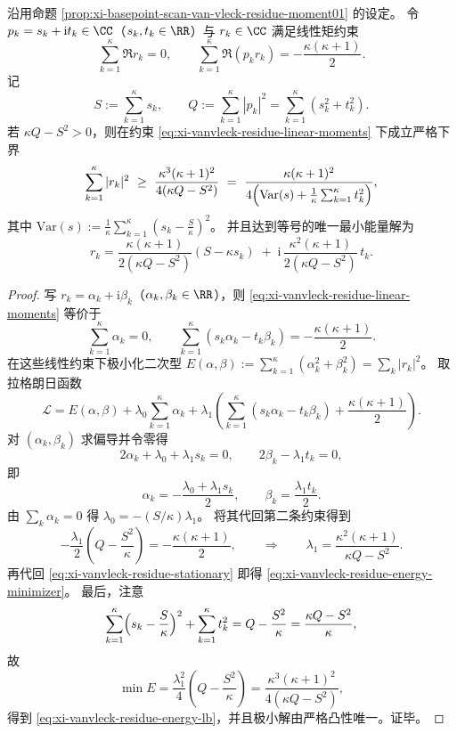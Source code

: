 \begin{theorem}\label{thm:xi-vanvleck-residue-l2-lower-bound}
沿用命题 \ref{prop:xi-basepoint-scan-van-vleck-residue-moment01} 的设定。
令 \(p_k=s_k+\mathrm{i}t_k\in\CC\)（\(s_k,t_k\in\RR\)）与 \(r_k\in\CC\) 满足线性矩约束
\begin{equation}\label{eq:xi-vanvleck-residue-linear-moments}
\sum_{k=1}^{\kappa}\Re r_k=0,
\qquad
\sum_{k=1}^{\kappa}\Re(p_k r_k)= -\frac{\kappa(\kappa+1)}{2}.
\end{equation}
记
\[
S:=\sum_{k=1}^{\kappa}s_k,\qquad
Q:=\sum_{k=1}^{\kappa}|p_k|^2=\sum_{k=1}^{\kappa}(s_k^2+t_k^2).
\]
若 \(\kappa Q-S^2>0\)，则在约束 \eqref{eq:xi-vanvleck-residue-linear-moments} 下成立严格下界
\begin{equation}\label{eq:xi-vanvleck-residue-energy-lb}
\sum_{k=1}^{\kappa}|r_k|^2
\ \ge\
\frac{\kappa^3(\kappa+1)^2}{4(\kappa Q-S^2)}
\ =\
\frac{\kappa(\kappa+1)^2}{4\Bigl(\mathrm{Var}(s)+\frac1\kappa\sum_{k=1}^{\kappa}t_k^2\Bigr)},
\end{equation}
其中 \(\mathrm{Var}(s):=\frac1\kappa\sum_{k=1}^{\kappa}(s_k-\frac{S}{\kappa})^2\)。
并且达到等号的唯一最小能量解为
\begin{equation}\label{eq:xi-vanvleck-residue-energy-minimizer}
r_k
=
\frac{\kappa(\kappa+1)}{2(\kappa Q-S^2)}(S-\kappa s_k)
\;+\;
\mathrm{i}\,\frac{\kappa^2(\kappa+1)}{2(\kappa Q-S^2)}\,t_k.
\end{equation}
\end{theorem}
\begin{proof}
写 \(r_k=\alpha_k+\mathrm{i}\beta_k\)（\(\alpha_k,\beta_k\in\RR\)），则 \eqref{eq:xi-vanvleck-residue-linear-moments} 等价于
\[
\sum_{k=1}^{\kappa}\alpha_k=0,\qquad
\sum_{k=1}^{\kappa}(s_k\alpha_k-t_k\beta_k)= -\frac{\kappa(\kappa+1)}{2}.
\]
在这些线性约束下极小化二次型
\(
E(\alpha,\beta):=\sum_{k=1}^{\kappa}(\alpha_k^2+\beta_k^2)
=\sum_k|r_k|^2
\)。
取拉格朗日函数
\[
\mathcal L
=E(\alpha,\beta)
+\lambda_0\sum_{k=1}^{\kappa}\alpha_k
+\lambda_1\left(\sum_{k=1}^{\kappa}(s_k\alpha_k-t_k\beta_k)+\frac{\kappa(\kappa+1)}{2}\right).
\]
对 \((\alpha_k,\beta_k)\) 求偏导并令零得
\[
2\alpha_k+\lambda_0+\lambda_1 s_k=0,\qquad
2\beta_k-\lambda_1 t_k=0,
\]
即
\begin{equation}\label{eq:xi-vanvleck-residue-stationary}
\alpha_k=-\frac{\lambda_0+\lambda_1 s_k}{2},\qquad \beta_k=\frac{\lambda_1 t_k}{2}.
\end{equation}
由 \(\sum_k\alpha_k=0\) 得 \(\lambda_0=-(S/\kappa)\lambda_1\)。
将其代回第二条约束得到
\[
-\frac{\lambda_1}{2}\left(Q-\frac{S^2}{\kappa}\right)=-\frac{\kappa(\kappa+1)}{2},
\qquad\Longrightarrow\qquad
\lambda_1=\frac{\kappa^2(\kappa+1)}{\kappa Q-S^2}.
\]
再代回 \eqref{eq:xi-vanvleck-residue-stationary} 即得 \eqref{eq:xi-vanvleck-residue-energy-minimizer}。
最后，注意
\[
\sum_{k=1}^{\kappa}\Bigl(s_k-\frac{S}{\kappa}\Bigr)^2+\sum_{k=1}^{\kappa}t_k^2
=Q-\frac{S^2}{\kappa}
=\frac{\kappa Q-S^2}{\kappa},
\]
故
\[
\min E
=\frac{\lambda_1^2}{4}\left(Q-\frac{S^2}{\kappa}\right)
=\frac{\kappa^3(\kappa+1)^2}{4(\kappa Q-S^2)},
\]
得到 \eqref{eq:xi-vanvleck-residue-energy-lb}，并且极小解由严格凸性唯一。证毕。
\end{proof}

